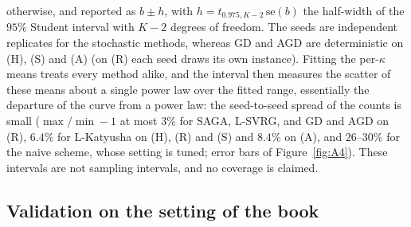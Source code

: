 otherwise, and reported as $b\pm h$, with $h=t_{0.975,K-2}\,\mathrm{se}(b)$ the half-width of the $95\%$ Student interval
with $K-2$ degrees of freedom. The seeds are independent replicates for the stochastic methods, whereas GD and AGD are
deterministic on (H), (S) and (A) (on (R) each seed draws its own instance). Fitting the per-$\kappa$ means treats every
method alike, and the interval then measures the scatter of these means about a single power law over the fitted range,
essentially the departure of the curve from a power law: the seed-to-seed spread of the counts is small ($\max/\min-1$ at
most $3\%$ for SAGA, L-SVRG, and GD and AGD on (R), $6.4\%$ for L-Katyusha on (H), (R) and (S) and $8.4\%$ on (A), and
$26$--$30\%$ for the naive scheme, whose setting is tuned; error bars of Figure~\ref{fig:A4}). These intervals are not
sampling intervals, and no coverage is claimed.

\subsection{Validation on the setting of the book}\label{sec:exp-validation}

